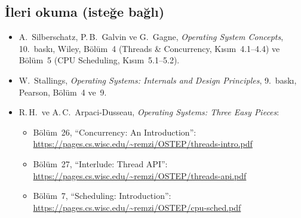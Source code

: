 \subsection*{İleri okuma (isteğe bağlı)}
\begin{itemize}
  \item A.\ Silberschatz, P.\,B.\ Galvin ve G.\ Gagne, \emph{Operating System Concepts}, 10.\ baskı, Wiley, Bölüm~4 (Threads \& Concurrency, Kısım~4.1--4.4) ve Bölüm~5 (CPU Scheduling, Kısım~5.1--5.2).
  \item W.\ Stallings, \emph{Operating Systems: Internals and Design Principles}, 9.\ baskı, Pearson, Bölüm~4 ve~9.
  \item R.\,H.\ ve A.\,C.\ Arpaci-Dusseau, \emph{Operating Systems: Three Easy Pieces}:
  \begin{itemize}
    \item Bölüm~26, ``Concurrency: An Introduction'': \url{https://pages.cs.wisc.edu/~remzi/OSTEP/threads-intro.pdf}
    \item Bölüm~27, ``Interlude: Thread API'': \url{https://pages.cs.wisc.edu/~remzi/OSTEP/threads-api.pdf}
    \item Bölüm~7, ``Scheduling: Introduction'': \url{https://pages.cs.wisc.edu/~remzi/OSTEP/cpu-sched.pdf}
  \end{itemize}
\end{itemize}
